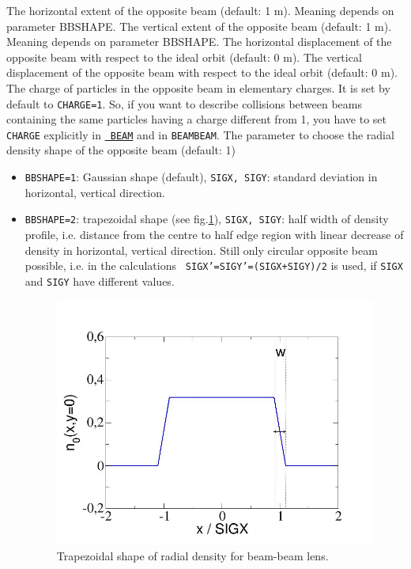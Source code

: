 {\begin{madlist}
     The horizontal extent of the opposite beam (default: 1 m).
     Meaning depends on parameter BBSHAPE.
     The vertical extent of the opposite beam (default: 1 m).
     Meaning depends on parameter BBSHAPE.
     The horizontal displacement of the opposite beam with respect to
     the ideal orbit (default: 0 m).
     The vertical displacement of the opposite beam with respect to
     the ideal orbit (default: 0 m).
     The charge of particles in the opposite beam in elementary charges. 
     It is set by default to {\tt CHARGE=1}. So, if you want to describe 
     collisions 
     between beams containing the same particles having a charge different 
     from 1, you have to set {\tt CHARGE} explicitly in \hyperref[sec:beam]{\tt 
     BEAM} and in {\tt BEAMBEAM}. 
    The parameter to choose the radial density shape of the 
     opposite beam (default: 1)
     \begin{itemize}
       \item  {\tt BBSHAPE=1}: Gaussian shape (default), {\tt SIGX, SIGY}: 
       standard deviation in horizontal, vertical direction.
       \item  {\tt BBSHAPE=2}: trapezoidal shape (see 
       fig.\ref{fig:beambeam_n_trapez}), {\tt SIGX, SIGY}: half width of 
       density profile, i.e. distance from the centre to half edge region with 
       linear decrease of density in horizontal, vertical direction. Still only 
       circular opposite beam possible, i.e. in the calculations {\tt 
       SIGX'=SIGY'=(SIGX+SIGY)/2} is used, if {\tt SIGX} and {\tt SIGY} have 
       different values.

\begin{figure}[h]
  \begin{center}
    \includegraphics[width=400px]{jpg/beambeam_n_trapez.jpg}
    \caption{Trapezoidal shape of radial density for beam-beam lens.} 
    \label{fig:beambeam_n_trapez}
  \end{center}
\end{figure}


\end{itemize}
\end{madlist}}

